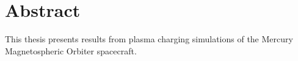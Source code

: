 \chapter{Abstract}
\label{sec:abstract}
This thesis presents results from plasma charging simulations of the Mercury Magnetospheric Orbiter spacecraft.